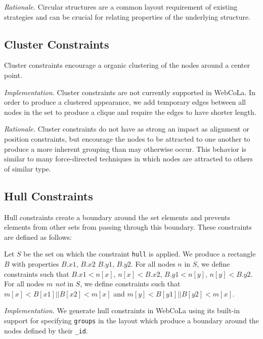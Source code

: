 \emph{Rationale.} Circular structures are a common layout requirement of
existing strategies  and can be crucial for relating
properties of the underlying structure.

\subsection{Cluster Constraints}
Cluster constraints encourage a organic clustering of the nodes around
a center point.


\emph{Implementation.}
Cluster constraints are not currently supported in WebCoLa. In order to
produce a clustered appearance, we add temporary edges between all nodes
in the set to produce a clique and require the edges to have shorter length.

\emph{Rationale.}
Cluster constraints do not have as strong an impact as alignment or
position constraints, but encourage the nodes to be attracted to one
another to produce a more inherent grouping than may otherwise occur.
This behavior is similar to many force-directed techniques in which
nodes are attracted to others of similar type.

\subsection{Hull Constraints}
Hull constraints create a boundary around the set elements and prevents
elements from other sets from passing through this boundary. These 
constraints are defined as follows:

\begin{definition}
Let $S$ be the set on which the constraint \texttt{hull} is applied. We produce a
rectangle $B$ with properties $B.x1$, $B.x2$ $B.y1$, $B.y2$. For all nodes
$n$ in $S$, we define constraints such that $B.x1 < n[x]$, $n[x] < B.x2$,
$B.y1 < n[y]$, $n[y] < B.y2$. For all nodes $m$ \emph{not} in $S$, we define
constraints such that $m[x] < B[x1] || B[x2] < m[x]$ and $m[y] < B[y1] || B[y2] < m[x]$.
\end{definition}

\emph{Implementation.}
We generate hull constraints in WebCoLa using its built-in support for 
specifying \texttt{groups} in the layout which produce a boundary around 
the nodes defined by their \texttt{\_id}.

